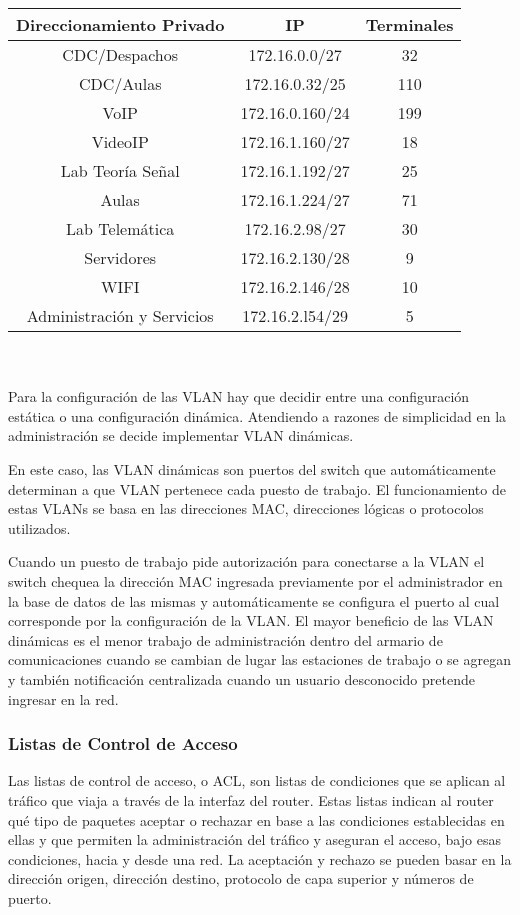 \documentclass[a4paper,10pt]{article}
\begin{document}
\begin{tabular}{|c|c|c|}
\hline  \textbf{Direccionamiento Privado} & IP & Terminales \\ 
\hline  CDC/Despachos & 172.16.0.0/27 & 32 \\ 
\hline  CDC/Aulas & 172.16.0.32/25 & 110 \\ 
\hline  VoIP & 172.16.0.160/24 & 199 \\ 
\hline  VideoIP & 172.16.1.160/27 & 18 \\ 
\hline  Lab Teoría Señal & 172.16.1.192/27 & 25 \\ 
\hline  Aulas & 172.16.1.224/27 & 71 \\ 
\hline  Lab Telemática & 172.16.2.98/27 & 30 \\ 
\hline  Servidores & 172.16.2.130/28 & 9 \\ 
\hline  WIFI & 172.16.2.146/28 & 10 \\ 
\hline  Administración y Servicios & 172.16.2.l54/29 & 5 \\ 
\hline 
\end{tabular}\\ \\
Para la configuración de las VLAN hay que decidir entre una configuración estática o una configuración dinámica. Atendiendo a razones de simplicidad en la administración se decide implementar VLAN dinámicas.

En este caso, las VLAN dinámicas son puertos del switch que automáticamente determinan a que VLAN pertenece cada puesto de trabajo. El funcionamiento de estas VLANs se basa en las direcciones MAC, direcciones lógicas o protocolos utilizados.

Cuando un puesto de trabajo pide autorización para conectarse a la VLAN el switch chequea la dirección MAC ingresada previamente por el administrador en la base de datos de las mismas y automáticamente se configura el puerto al cual corresponde por la configuración de la VLAN. 
El mayor beneficio de las VLAN dinámicas es el menor trabajo de administración dentro del armario de comunicaciones cuando se cambian de lugar las estaciones de trabajo o se agregan y también notificación centralizada cuando un usuario desconocido pretende ingresar en la red.
\subsubsection{Listas de Control de Acceso}
Las listas de control de acceso, o ACL, son listas de condiciones que se aplican al tráfico que viaja a través de la interfaz del router.
Estas listas indican al router qué tipo de paquetes aceptar o rechazar en base a las condiciones establecidas en ellas y que permiten la administración del tráfico y aseguran el acceso, bajo esas condiciones, hacia y desde una red.
La aceptación y rechazo se pueden basar en la dirección origen, dirección destino, protocolo de capa superior y números de puerto.
\end{document}
